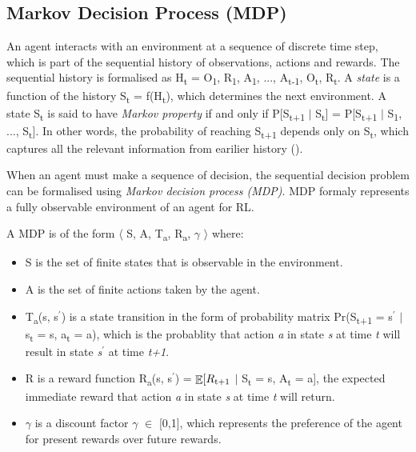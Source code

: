 \documentclass[12pt,twoside]{report}
\DeclareMathOperator{\E}{\mathbb{E}}
\begin{document}
\subsection{Markov Decision Process (MDP)}
\label{mdp_subsection}
An agent interacts with an environment at a sequence of discrete time step, which is part of the sequential history of observations, actions and rewards. The sequential history is formalised as H\textsubscript{t} = O\textsubscript{1}, R\textsubscript{1}, A\textsubscript{1}, ..., A\textsubscript{t-1}, O\textsubscript{t}, R\textsubscript{t}.  A \textit{state} is a function of the history S\textsubscript{t} = f(H\textsubscript{t}), which determines the next environment.  A state S\textsubscript{t} is said to have \textit{Markov property} if and only if P[S\textsubscript{t+1} $\vert$ S\textsubscript{t}] = P[S\textsubscript{t+1} $\vert$ S\textsubscript{1}, ..., S\textsubscript{t}]. In other words, the probability of reaching S\textsubscript{t+1} depends only on S\textsubscript{t}, which captures all the relevant information from earilier history (\cite{Puterman1994}).

When an agent must make a sequence of decision, the sequential decision problem can be formalised using \textit{Markov decision process (MDP)}. MDP formaly represents a fully observable environment of an agent for RL.

A MDP is of the form $\langle$ S, A, T\textsubscript{a}, R\textsubscript{a}, $\gamma$ $\rangle$ where:

\begin{itemize}
\item S is the set of finite states that is observable in the environment.
\item A is the set of finite actions taken by the agent.
\item T\textsubscript{a}(s, s$^\prime$) is a state transition in the form of probability matrix Pr(S\textsubscript{t+1} = s$^\prime$ $\vert$ s\textsubscript{t} = s, a\textsubscript{t} = a), which is the probablity that action \textit{a} in state \textit{s} at time \textit{t} will result in state \textit{s$^\prime$} at time \textit{t+1}.
\item R is a reward function R\textsubscript{a}(s, s$^\prime$) = $\displaystyle \E[R\textsubscript{t+1} $ $\vert$ S\textsubscript{t} = s, A\textsubscript{t} = a], the expected immediate reward that action \textit{a} in state \textit{s} at time \textit{t} will return.
\item $\gamma$ is a discount factor $\gamma$ $\in$ [0,1], which represents the preference of the agent for present rewards over future rewards.
\end{itemize}
\end{document}
